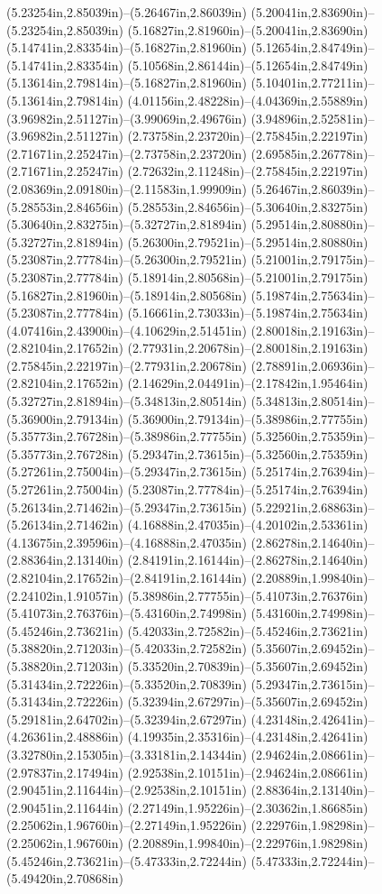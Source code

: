 (5.23254in,2.85039in)--(5.26467in,2.86039in) (5.20041in,2.83690in)--(5.23254in,2.85039in) (5.16827in,2.81960in)--(5.20041in,2.83690in) (5.14741in,2.83354in)--(5.16827in,2.81960in) (5.12654in,2.84749in)--(5.14741in,2.83354in) (5.10568in,2.86144in)--(5.12654in,2.84749in) (5.13614in,2.79814in)--(5.16827in,2.81960in) (5.10401in,2.77211in)--(5.13614in,2.79814in) (4.01156in,2.48228in)--(4.04369in,2.55889in) (3.96982in,2.51127in)--(3.99069in,2.49676in) (3.94896in,2.52581in)--(3.96982in,2.51127in) (2.73758in,2.23720in)--(2.75845in,2.22197in) (2.71671in,2.25247in)--(2.73758in,2.23720in) (2.69585in,2.26778in)--(2.71671in,2.25247in) (2.72632in,2.11248in)--(2.75845in,2.22197in) (2.08369in,2.09180in)--(2.11583in,1.99909in) (5.26467in,2.86039in)--(5.28553in,2.84656in) (5.28553in,2.84656in)--(5.30640in,2.83275in) (5.30640in,2.83275in)--(5.32727in,2.81894in) (5.29514in,2.80880in)--(5.32727in,2.81894in) (5.26300in,2.79521in)--(5.29514in,2.80880in) (5.23087in,2.77784in)--(5.26300in,2.79521in) (5.21001in,2.79175in)--(5.23087in,2.77784in) (5.18914in,2.80568in)--(5.21001in,2.79175in) (5.16827in,2.81960in)--(5.18914in,2.80568in) (5.19874in,2.75634in)--(5.23087in,2.77784in) (5.16661in,2.73033in)--(5.19874in,2.75634in) (4.07416in,2.43900in)--(4.10629in,2.51451in) (2.80018in,2.19163in)--(2.82104in,2.17652in) (2.77931in,2.20678in)--(2.80018in,2.19163in) (2.75845in,2.22197in)--(2.77931in,2.20678in) (2.78891in,2.06936in)--(2.82104in,2.17652in) (2.14629in,2.04491in)--(2.17842in,1.95464in) (5.32727in,2.81894in)--(5.34813in,2.80514in) (5.34813in,2.80514in)--(5.36900in,2.79134in) (5.36900in,2.79134in)--(5.38986in,2.77755in) (5.35773in,2.76728in)--(5.38986in,2.77755in) (5.32560in,2.75359in)--(5.35773in,2.76728in) (5.29347in,2.73615in)--(5.32560in,2.75359in) (5.27261in,2.75004in)--(5.29347in,2.73615in) (5.25174in,2.76394in)--(5.27261in,2.75004in) (5.23087in,2.77784in)--(5.25174in,2.76394in) (5.26134in,2.71462in)--(5.29347in,2.73615in) (5.22921in,2.68863in)--(5.26134in,2.71462in) (4.16888in,2.47035in)--(4.20102in,2.53361in) (4.13675in,2.39596in)--(4.16888in,2.47035in) (2.86278in,2.14640in)--(2.88364in,2.13140in) (2.84191in,2.16144in)--(2.86278in,2.14640in) (2.82104in,2.17652in)--(2.84191in,2.16144in) (2.20889in,1.99840in)--(2.24102in,1.91057in) (5.38986in,2.77755in)--(5.41073in,2.76376in) (5.41073in,2.76376in)--(5.43160in,2.74998in) (5.43160in,2.74998in)--(5.45246in,2.73621in) (5.42033in,2.72582in)--(5.45246in,2.73621in) (5.38820in,2.71203in)--(5.42033in,2.72582in) (5.35607in,2.69452in)--(5.38820in,2.71203in) (5.33520in,2.70839in)--(5.35607in,2.69452in) (5.31434in,2.72226in)--(5.33520in,2.70839in) (5.29347in,2.73615in)--(5.31434in,2.72226in) (5.32394in,2.67297in)--(5.35607in,2.69452in) (5.29181in,2.64702in)--(5.32394in,2.67297in) (4.23148in,2.42641in)--(4.26361in,2.48886in) (4.19935in,2.35316in)--(4.23148in,2.42641in) (3.32780in,2.15305in)--(3.33181in,2.14344in) (2.94624in,2.08661in)--(2.97837in,2.17494in) (2.92538in,2.10151in)--(2.94624in,2.08661in) (2.90451in,2.11644in)--(2.92538in,2.10151in) (2.88364in,2.13140in)--(2.90451in,2.11644in) (2.27149in,1.95226in)--(2.30362in,1.86685in) (2.25062in,1.96760in)--(2.27149in,1.95226in) (2.22976in,1.98298in)--(2.25062in,1.96760in) (2.20889in,1.99840in)--(2.22976in,1.98298in) (5.45246in,2.73621in)--(5.47333in,2.72244in) (5.47333in,2.72244in)--(5.49420in,2.70868in) 
